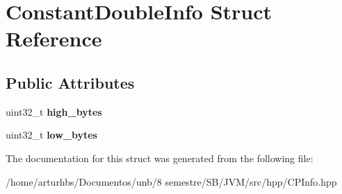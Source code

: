 \hypertarget{structConstantDoubleInfo}{}\section{Constant\+Double\+Info Struct Reference}
\label{structConstantDoubleInfo}
\subsection*{Public Attributes}
\begin{DoxyCompactItemize}
\item 
uint32\+\_\+t {\bfseries high\+\_\+bytes}\hypertarget{structConstantDoubleInfo_a4390f86345cd246c4ffbb2f76fe2783d}{}\label{structConstantDoubleInfo_a4390f86345cd246c4ffbb2f76fe2783d}

\item 
uint32\+\_\+t {\bfseries low\+\_\+bytes}\hypertarget{structConstantDoubleInfo_a5559dde9df215499faab8d2e409e0044}{}\label{structConstantDoubleInfo_a5559dde9df215499faab8d2e409e0044}

\end{DoxyCompactItemize}


The documentation for this struct was generated from the following file\+:\begin{DoxyCompactItemize}
\item 
/home/arturhbs/\+Documentos/unb/8 semestre/\+S\+B/\+J\+V\+M/src/hpp/C\+P\+Info.\+hpp\end{DoxyCompactItemize}
